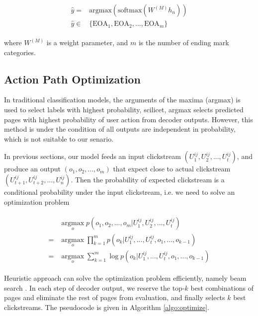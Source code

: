 \begin{align}
\label{eqn:lstm}
\begin{split}
    \hat{y} =& \text{argmax} (\text{softmax} (W^{(M)} h_n)) \\
    \hat{y} \in& \{ \text{EOA}_1, \text{EOA}_2, ..., \text{EOA}_m \}
\end{split}
\end{align}

where $W^{(M)}$ is a weight parameter, and $m$ is the number of ending mark categories.

\subsection{Action Path Optimization}

In traditional classification models, the arguments of the maxima (argmax) is used to select
labels with highest probability, scilicet, argmax selects predicted pages with highest probability
of user action from decoder outputs. However, this method is under the condition of all outputs
are independent in probability, which is not suitable to our senario.

In previous sections, our model feeds an input clickstream $(U^{ij}_1, U^{ij}_2, ..., U^{ij}_t)$,
and produce an output $(o_1, o_2, ..., o_{m})$ that expect close to actual clickstream $(U^{ij}_{t+1}, U^{ij}_{t+2}, ..., U^{ij}_n)$.
Then the probability of expected clickstream is 
a conditional probability under the input clickstream, i.e. we need to solve an optimization problem

\begin{align}
\label{eqn:lstm}
\begin{split}
    & \operatorname*{argmax}_{o} p( o_1, o_2, ..., o_{m} | U^{ij}_1, U^{ij}_2, ..., U^{ij}_t ) \\
   =& \operatorname*{argmax}_{o} \prod_{k=1}^{m} p(o_{k} | U^{ij}_1, ..., U^{ij}_t, o_1, ..., o_{k-1}) \\
   =& \operatorname*{argmax}_{o} \sum_{k=1}^{m} \log p(o_{k} | U^{ij}_1, ..., U^{ij}_t, o_1, ..., o_{k-1})
\end{split}
\end{align}

Heuristic approach can solve the optimization problem efficiently, namely beam search \cite{DBLP:journals/corr/abs-1211-3711}. 
In each step of decoder output, we reserve the top-$k$ best combinations of pages and eliminate the rest of
pages from evaluation, and finally selects $k$ best clickstreams.
The pseudocode is given in Algorithm \ref{algo:optimize}.

